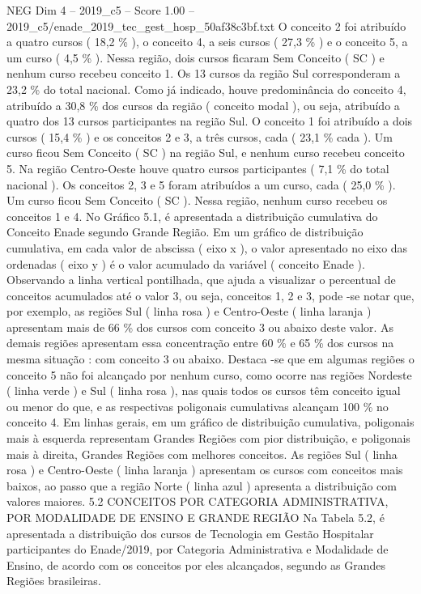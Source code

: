\begin{textsample}{NEG Dim 4 – 2019\_c5 – Score 1.00 – 2019\_c5/enade\_2019\_tec\_gest\_hosp\_50af38c3bf.txt}
O conceito 2 foi atribuído a quatro cursos ( 18,2 \% ), o conceito 4, a seis cursos ( 27,3 \% ) e o conceito 5, a um curso ( 4,5 \% ).
Nessa região, dois cursos ficaram Sem Conceito ( SC ) e nenhum curso recebeu conceito 1.
Os 13 cursos da região Sul corresponderam a 23,2 \% do total nacional.
Como já indicado, houve predominância do conceito 4, atribuído a 30,8 \% dos cursos da região ( conceito modal ), ou seja, atribuído a quatro dos 13 cursos participantes na região Sul.
O conceito 1 foi atribuído a dois cursos ( 15,4 \% ) e os conceitos 2 e 3, a três cursos, cada ( 23,1 \% cada ).
Um curso ficou Sem Conceito ( SC ) na região Sul, e nenhum curso recebeu conceito 5.
Na região Centro-Oeste houve quatro cursos participantes ( 7,1 \% do total nacional ).
Os conceitos 2, 3 e 5 foram atribuídos a um curso, cada ( 25,0 \% ).
Um curso ficou Sem Conceito ( SC ).
Nessa região, nenhum curso recebeu os conceitos 1 e 4.
No Gráfico 5.1, é apresentada a distribuição cumulativa do Conceito Enade segundo Grande Região.
Em um gráfico de distribuição cumulativa, em cada valor de abscissa ( eixo x ), o valor apresentado no eixo das ordenadas ( eixo y ) é o valor acumulado da variável ( conceito Enade ).
Observando a linha vertical pontilhada, que ajuda a visualizar o percentual de conceitos acumulados até o valor 3, ou seja, conceitos 1, 2 e 3, pode -se notar que, por exemplo, as regiões Sul ( linha rosa ) e Centro-Oeste ( linha laranja ) apresentam mais de 66 \% dos cursos com conceito 3 ou abaixo deste valor.
As demais regiões apresentam essa concentração entre 60 \% e 65 \% dos cursos na mesma situação : com conceito 3 ou abaixo.
Destaca -se que em algumas regiões o conceito 5 não foi alcançado por nenhum curso, como ocorre nas regiões Nordeste ( linha verde ) e Sul ( linha rosa ), nas quais todos os cursos têm conceito igual ou menor do que, e as respectivas poligonais cumulativas alcançam 100 \% no conceito 4.
Em linhas gerais, em um gráfico de distribuição cumulativa, poligonais mais à esquerda representam Grandes Regiões com pior distribuição, e poligonais mais à direita, Grandes Regiões com melhores conceitos.
As regiões Sul ( linha rosa ) e Centro-Oeste ( linha laranja ) apresentam os cursos com conceitos mais baixos, ao passo que a região Norte ( linha azul ) apresenta a distribuição com valores maiores. 5.2 CONCEITOS POR CATEGORIA ADMINISTRATIVA, POR MODALIDADE DE ENSINO E GRANDE REGIÃO Na Tabela 5.2, é apresentada a distribuição dos cursos de Tecnologia em Gestão Hospitalar participantes do Enade/2019, por Categoria Administrativa e Modalidade de Ensino, de acordo com os conceitos por eles alcançados, segundo as Grandes Regiões brasileiras.

\end{textsample}
